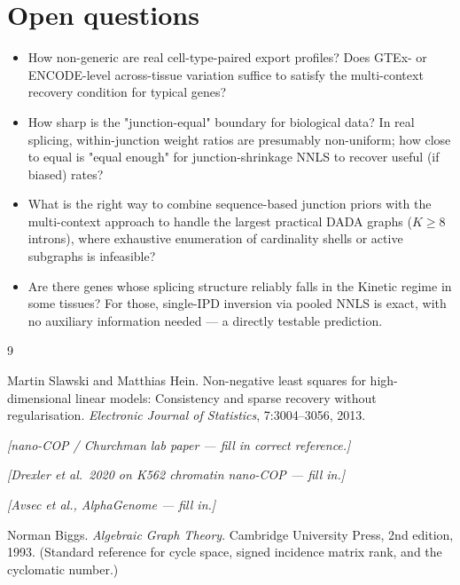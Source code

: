 \documentclass[11pt, a4paper]{article}
\newcommand{\note}[1]{\textcolor{red!70!black}{\textit{[#1]}}}
\begin{document}
\section{Open questions}

\begin{itemize}[leftmargin=*, itemsep=4pt, topsep=2pt]
  \item How non-generic are real cell-type-paired export profiles? Does GTEx- or ENCODE-level across-tissue variation suffice to satisfy the multi-context recovery condition for typical genes?
  \item How sharp is the "junction-equal" boundary for biological data? In real splicing, within-junction weight ratios are presumably non-uniform; how close to equal is "equal enough" for junction-shrinkage NNLS to recover useful (if biased) rates?
  \item What is the right way to combine sequence-based junction priors with the multi-context approach to handle the largest practical DADA graphs ($K \geq 8$ introns), where exhaustive enumeration of cardinality shells or active subgraphs is infeasible?
  \item Are there genes whose splicing structure reliably falls in the Kinetic regime in some tissues? For those, single-IPD inversion via pooled NNLS is exact, with no auxiliary information needed --- a directly testable prediction.
\end{itemize}


\begin{thebibliography}{9}

Martin Slawski and Matthias Hein.
\newblock Non-negative least squares for high-dimensional linear models: Consistency and sparse recovery without regularisation.
\newblock \emph{Electronic Journal of Statistics}, 7:3004--3056, 2013.

\note{nano-COP / Churchman lab paper --- fill in correct reference.}

\note{Drexler et al.\ 2020 on K562 chromatin nano-COP --- fill in.}

\note{Avsec et al., AlphaGenome --- fill in.}

Norman Biggs.
\newblock \emph{Algebraic Graph Theory}.
\newblock Cambridge University Press, 2nd edition, 1993.
\newblock (Standard reference for cycle space, signed incidence matrix rank, and the cyclomatic number.)

\end{thebibliography}
\end{document}
